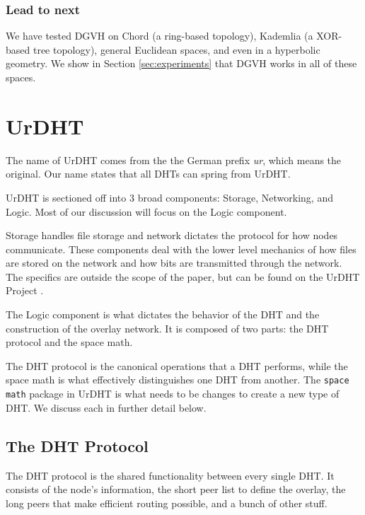 \documentclass[11pt,conference]{IEEEtran}
\begin{document}
\subsubsection*{Lead to next}
We have tested DGVH on Chord (a ring-based topology), Kademlia (a XOR-based tree topology), general Euclidean spaces, and even in a hyperbolic geometry.
We show in Section \ref{sec:experiments} that DGVH works in all of these spaces.



\section{UrDHT}
\label{sec:urdht}
	
	The name of UrDHT comes from the the German prefix \textit{ur}, which means the original. 
	Our name states that all DHTs can spring from UrDHT.
	
	UrDHT is sectioned off into 3 broad components: Storage, Networking, and Logic.
	Most of our discussion will focus on the Logic component.
	
	Storage handles file storage and network dictates the protocol for how nodes communicate.
	These components deal with the lower level mechanics of how files are stored on the network and how bits are transmitted through the network.
	The specifics are outside the scope of the paper, but can be found on the UrDHT Project \cite{urdht}.
	
	
	The Logic component is what dictates the behavior of the DHT and the construction of the overlay network.
	It is composed of two parts: the DHT protocol and the space math.
	
	The DHT protocol is the canonical operations that a DHT performs, while the space math is what effectively distinguishes one DHT from another.
	The \texttt{space math} package in UrDHT is what needs to be changes to create a new type of DHT.
	We discuss each in further detail below.
	
	
	\subsection{The DHT Protocol }
	The DHT protocol is the shared functionality between every single DHT.
	It consists of the node's information, the short peer list to define the overlay, the long peers that make efficient routing possible, and a bunch of other stuff.
	
	
	
\end{document}
